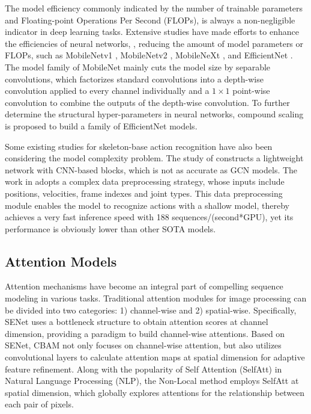\documentclass[10pt,journal,compsoc]{IEEEtran}
\begin{document}
The model efficiency commonly indicated by the number of trainable parameters and Floating-point Operations Per Second (FLOPs), is always a non-negligible indicator in deep learning tasks. Extensive studies have made efforts to enhance the efficiencies of neural networks, \ie, reducing the amount of model parameters or FLOPs, such as MobileNetv1 \cite{howard2017mobilenets}, MobileNetv2 \cite{sandler2018mobilenetv2}, MobileNeXt \cite{zhou2020rethinking}, and EfficientNet \cite{tan2019efficientnet}. The model family of MobileNet mainly cuts the model size by separable convolutions, which factorizes standard convolutions into a depth-wise convolution applied to every channel individually and a $1\times1$ point-wise convolution to combine the outputs of the depth-wise convolution. To further determine the structural hyper-parameters in neural networks, compound scaling \cite{tan2019efficientnet} is proposed to build a family of EfficientNet models.

Some existing studies for skeleton-base action recognition have also been considering the model complexity problem. The study of \cite{yang2019make} constructs a lightweight network with CNN-based blocks, which is not as accurate as GCN models. The work in \cite{zhang2020semantics} adopts a complex data preprocessing strategy, whose inputs include positions, velocities, frame indexes and joint types. This data preprocessing module enables the model to recognize actions with a shallow model, thereby achieves a very fast inference speed with 188 sequences/(second*GPU), yet its performance is obviously lower than other SOTA models.

\subsection{Attention Models}
\label{ssec:related_attention}

Attention mechanisms have become an integral part of compelling sequence modeling in various tasks. Traditional attention modules for image processing can be divided into two categories: 1) channel-wise and 2) spatial-wise. Specifically, SENet \cite{hu2018squeeze} uses a bottleneck structure to obtain attention scores at channel dimension, providing a paradigm to build channel-wise attentions. Based on SENet, CBAM \cite{woo2018cbam} not only focuses on channel-wise attention, but also utilizes convolutional layers to calculate attention maps at spatial dimension for adaptive feature refinement. Along with the popularity of Self Attention (SelfAtt) in Natural Language Processing (NLP), the Non-Local \cite{wang2018non} method employs SelfAtt at spatial dimension, which globally explores attentions for the relationship between each pair of pixels.
\end{document}
